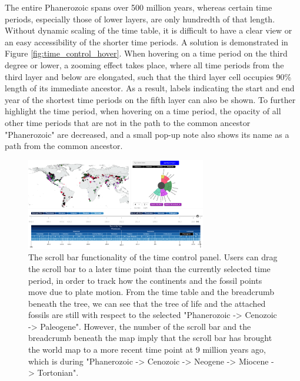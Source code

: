 \documentclass[11pt, a4paper,oneside,chapterprefix=false]{scrbook}
\begin{document}
The entire Phanerozoic spans over 500 million years, whereas certain time periods, especially those of lower layers, are only hundredth of that length. Without dynamic scaling of the time table, it is difficult to have a clear view or an easy accessibility of the shorter time periods. A solution is demonstrated in Figure \ref{fig:time_control_hover}. When hovering on a time period on the third degree or lower, a zooming effect takes place, where all time periods from the third layer and below are elongated, such that the third layer cell occupies 90\% length of its immediate ancestor. As a result, labels indicating the start and end year of the shortest time periods on the fifth layer can also be shown. To further highlight the time period, when hovering on a time period, the opacity of all other time periods that are not in the path to the common ancestor "Phanerozoic" are decreased, and a small pop-up note also shows its name as a path from the common ancestor. \\
\newpage
\begin{figure}[h]
	\centering
	\includegraphics[width=0.7\textwidth]{figures/technical_solution/time_control/time_point}
	\caption{The scroll bar functionality of the time control panel. Users can drag the scroll bar to a later time point than the currently selected time period, in order to track how the continents and the fossil points move due to plate motion. From the time table and the breadcrumb beneath the tree, we can see that the tree of life and the attached fossils are still with respect to the selected "Phanerozoic -> Cenozoic -> Paleogene". However, the number of the scroll bar and the breadcrumb beneath the map imply that the scroll bar has brought the world map to a more recent time point at 9 million years ago, which is during "Phanerozoic -> Cenozoic -> Neogene -> Miocene -> Tortonian".}
	\label{fig:time_control_point}
\end{figure}
\end{document}
